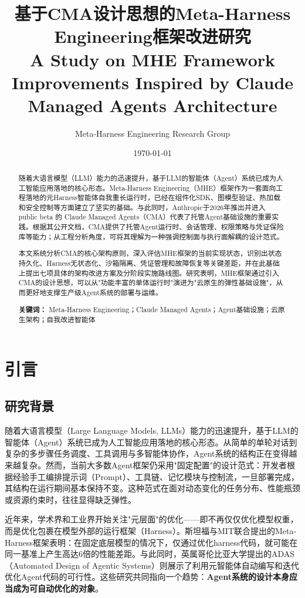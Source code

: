 \documentclass[12pt,a4paper]{ctexart}
\title{\textbf{基于CMA设计思想的Meta-Harness Engineering框架改进研究}\\\vspace{0.5em}
\large A Study on MHE Framework Improvements Inspired by Claude Managed Agents Architecture}
\author{Meta-Harness Engineering Research Group}
\date{\today}
\begin{document}
\maketitle

\begin{abstract}
随着大语言模型（LLM）能力的迅速提升，基于LLM的智能体（Agent）系统已成为人工智能应用落地的核心形态。Meta-Harness Engineering（MHE）框架作为一套面向工程落地的元Harness智能体自我重长运行时，已经在组件化SDK、图模型验证、热加载和安全控制等方面建立了坚实的基础。与此同时，Anthropic于2026年推出并进入 public beta 的 Claude Managed Agents（CMA）代表了托管Agent基础设施的重要实践。根据其公开文档，CMA提供了托管Agent运行时、会话管理、权限策略与凭证保险库等能力；从工程分析角度，可将其理解为一种强调控制面与执行面解耦的设计范式。

本文系统分析CMA的核心架构原则，深入评估MHE框架的当前实现状态，识别出状态持久化、Harness无状态化、沙箱隔离、凭证管理和故障恢复等关键差距，并在此基础上提出七项具体的架构改进方案及分阶段实施路线图。研究表明，MHE框架通过引入CMA的设计思想，可以从"功能丰富的单体运行时"演进为"云原生的弹性基础设施"，从而更好地支撑生产级Agent系统的部署与运维。

\textbf{关键词：} Meta-Harness Engineering；Claude Managed Agents；Agent基础设施；云原生架构；自我改进智能体
\end{abstract}

\tableofcontents
\newpage

\section{引言}\label{sec:intro}

\subsection{研究背景}

随着大语言模型（Large Language Models, LLMs）能力的迅速提升，基于LLM的智能体（Agent）系统已成为人工智能应用落地的核心形态。从简单的单轮对话到复杂的多步骤任务调度、工具调用与多智能体协作，Agent系统的结构正在变得越来越复杂。然而，当前大多数Agent框架仍采用"固定配置"的设计范式：开发者根据经验手工编排提示词（Prompt）、工具链、记忆模块与控制流，一旦部署完成，其结构在运行期间基本保持不变。这种范式在面对动态变化的任务分布、性能瓶颈或资源约束时，往往显得缺乏弹性。

近年来，学术界和工业界开始关注"元层面"的优化——即不再仅仅优化模型权重，而是优化包裹在模型外部的运行框架（Harness）。斯坦福与MIT联合提出的Meta-Harness框架表明：在固定底层模型的情况下，仅通过优化harness代码，就可能在同一基准上产生高达6倍的性能差距。与此同时，英属哥伦比亚大学提出的ADAS（Automated Design of Agentic Systems）则展示了利用元智能体自动编写和迭代优化Agent代码的可行性。这些研究共同指向一个趋势：\textbf{Agent系统的设计本身应当成为可自动优化的对象}。
\end{document}
